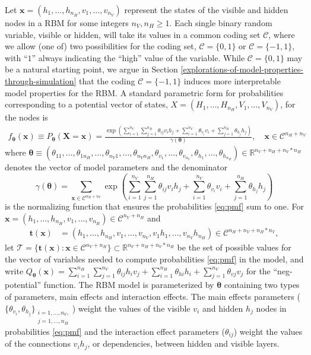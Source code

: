 \documentclass[AMS,STIX1COL]{WileyNJD-v2}
\newcommand{\nv}{{n_{\scriptscriptstyle V}}}
\newcommand{\nh}{{n_{\scriptscriptstyle H}}}
\begin{document}
Let \(\boldsymbol x = (h_1, \dots, h_\nh, v_1,\dots,v_\nv)\) represent
the states of the visible and hidden nodes in a RBM for some integers
\(\nv, \nh \ge 1\). Each single binary random variable, visible or
hidden, will take its values in a common coding set \(\mathcal{C}\),
where we allow (one of) two possibilities for the coding set,
\(\mathcal{C}=\{0,1\}\) or \(\mathcal{C}=\{-1,1\}\), with ``\(1\)''
always indicating the ``high'' value of the variable. While
\(\mathcal{C}=\{0,1\}\) may be a natural starting point, we argue in
Section \ref{explorations-of-model-properties-through-simulation} that
the coding \(\mathcal{C}=\{-1,1\}\) induces more interpretable model
properties for the RBM. A standard parametric form for probabilities
corresponding to a potential vector of states,
\(X = (H_1, \dots, H_\nh, V_1,\dots,V_\nv)\), for the nodes is
\begin{align}
\label{eq:pmf}
f_{\boldsymbol \theta} (\boldsymbol x)\equiv P_{\boldsymbol \theta}(\boldsymbol X = \boldsymbol x) = \frac{\exp\left(\sum\limits_{i = 1}^\nv \sum\limits_{j=1}^\nh \theta_{ij} v_i h_j + \sum\limits_{i = 1}^\nv\theta_{v_i} v_i + \sum\limits_{j = 1}^\nh\theta_{h_j} h_j\right)}{\gamma(\boldsymbol \theta)}, \quad \boldsymbol x \in \mathcal{C}^{\nh + \nv} 
\end{align} where
\(\boldsymbol \theta \equiv (\theta_{11}, \dots, \theta_{1\nh}, \dots, \theta_{\nv 1}, \dots, \theta_{\nv \nh}, \theta_{v_1}, \dots, \theta_{v_\nv}, \theta_{h_1}, \dots, \theta_{h_\nh}) \in \mathbb{R}^{\nv + \nh + \nv*\nh}\)
denotes the vector of model parameters and the denominator \[
\gamma(\boldsymbol \theta) = \sum_{\boldsymbol x \in \mathcal{C}^{\nh+\nv}}\exp\left(\sum_{i = 1}^\nv \sum_{j=1}^\nh \theta_{ij} v_i h_j + \sum_{i = 1}^\nv\theta_{v_i} v_i + \sum_{j = 1}^\nh\theta_{h_j} h_j\right)
\] is the normalizing function that ensures the probabilities
\eqref{eq:pmf} sum to one. For
\(\boldsymbol x = (h_1, \dots, h_\nh, v_1, \dots, v_\nh) \in \mathcal{C}^{\nv + \nh}\)
and \begin{align}
\boldsymbol t(\boldsymbol x) &= (h_1, \dots, h_\nh, v_1, \dots, v_\nv, v_1 h_1, \dots, v_\nv h_\nh) \in \mathcal{C}^{\nh + \nv + \nh*\nv}, \label{eq:t}
\end{align} let
\(\mathcal{T} = \{\boldsymbol t(\boldsymbol x): \boldsymbol x \in \mathcal{C}^{\nv + \nh}\} \subset \mathbb{R}^{\nv + \nh + \nv * \nh}\)
be the set of possible values for the vector of variables needed to
compute probabilities \eqref{eq:pmf} in the model, and write
\(Q_{\boldsymbol \theta}(\boldsymbol x) = \sum\limits_{i = 1}^\nh\sum\limits_{j=1}^\nv \theta_{ij} h_i v_j + \sum\limits_{i = 1}^\nh\theta_{hi} h_i + \sum\limits_{j = 1}^\nv\theta_{vj} v_j\)
for the ``neg-potential'' function. The RBM model is parameterized by
\(\boldsymbol \theta\) containing two types of parameters, main effects
and interaction effects. The main effects parameters
(\(\{\theta_{v_i}, \theta_{h_j}\}_{\substack{i = 1, \dots, \nv,\\j = 1, \dots, \nh}}\))
weight the values of the visible \(v_i\) and hidden \(h_j\) nodes in
probabilities \eqref{eq:pmf} and the interaction effect parameters
(\(\theta_{ij}\)) weight the values of the connections \(v_i h_j\), or
dependencies, between hidden and visible layers.
\end{document}
